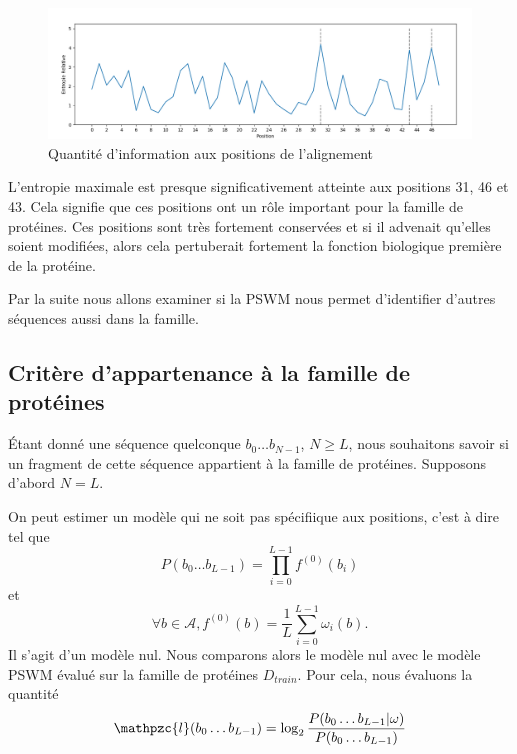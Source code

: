 \documentclass[a4paper, french]{article}
\begin{document}
\begin{figure}[h]
\begin{center}
    \includegraphics[width=14cm]{images/shannon_relative}
    \caption{Quantit\'e d'information aux positions de l'alignement}
    \label{fig:shannon_relative}
\end{center}
\end{figure}

L'entropie maximale est presque significativement atteinte aux positions
31, 46 et 43. Cela signifie que ces positions ont un r\^ole important
pour la famille de prot\'eines. Ces positions sont tr\`es fortement conserv\'ees
et si il advenait qu'elles soient modifi\'ees, alors cela pertuberait fortement
la fonction biologique premi\`ere de la prot\'eine.

Par la suite nous allons examiner si la PSWM nous permet d'identifier
d'autres s\'equences aussi dans la famille.

\subsection{Crit\`ere d'appartenance \`a la famille de prot\'eines}

\'Etant donn\'e une s\'equence quelconque $b_0\ldots b_{N-1}$, $N\geq L$,
nous souhaitons savoir si un fragment de cette s\'equence appartient
\`a la famille de prot\'eines. Supposons d'abord $N=L$.

On peut estimer un mod\`ele qui ne soit pas sp\'ecifiique aux positions,
c'est \`a dire tel que
\begin{equation*}
    P(b_0\ldots b_{L-1}) = \prod_{i=0}^{L-1} f^{(0)}(b_i)
\end{equation*}
et
\begin{equation*}
    \forall{b\in \mathcal{A}},
    f^{(0)}(b)=\frac{1}{L}\sum_{i=0}^{L-1}\omega_i(b).
\end{equation*}
Il s'agit d'un mod\`ele nul.
Nous comparons alors le mod\`ele nul avec le mod\`ele PSWM \'evalu\'e sur
la famille de prot\'eines $D_{train}$. Pour cela, nous \'evaluons la quantit\'e
\newcommand{\lodd}{\mathpzc{l}}
\begin{equation*}
    \lodd(b_0\ldots b_{L-1}) = \log_2
    \frac{P(b_0\ldots b_{L-1}|\omega)}{P(b_0\ldots b_{L-1})}
\end{equation*}
\end{document}
